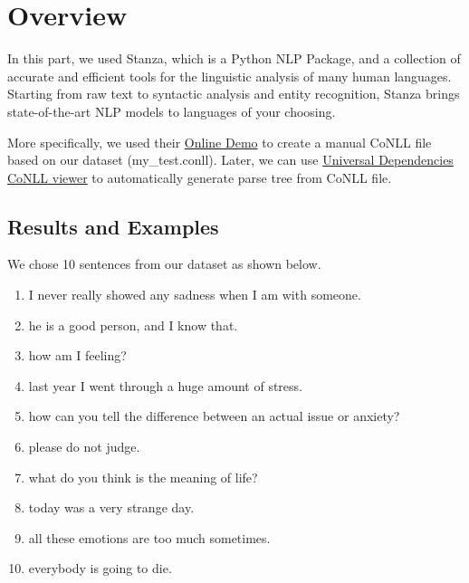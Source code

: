 \documentclass[12pt, a4paper]{article}
\begin{document}
	\section{Overview}
	In this part, we used Stanza, which is a Python NLP Package, and a collection of accurate and efficient tools for the linguistic analysis of many human languages. Starting from raw text to syntactic analysis and entity recognition, Stanza brings state-of-the-art NLP models to languages of your choosing.
	
	More specifically, we used their \href{http://stanza.run/}{Online Demo} to create a manual CoNLL file based on our dataset (my\_test.conll). Later, we can use \href{https://universaldependencies.org/conllu_viewer.html}{Universal Dependencies CoNLL viewer} to automatically generate parse tree from CoNLL file.
	
	\subsection{Results and Examples}
	We chose 10 sentences from our dataset as shown below.
	\begin{enumerate}
		\item I never really showed any sadness when I am with someone.
		\item he is a good person, and I know that.
		\item how am I feeling?
		\item last year I went through a huge amount of stress.
		\item how can you tell the difference between an actual issue or anxiety?
		\item please do not judge.
		\item what do you think is the meaning of life?
		\item today was a very strange day.
		\item all these emotions are too much sometimes. 
		\item everybody is going to die.
	\end{enumerate}
	
\end{document}
